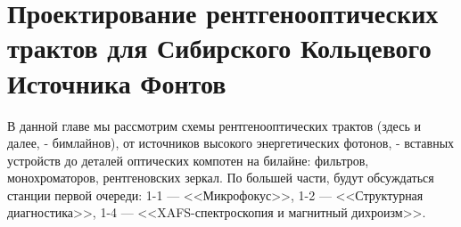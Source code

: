 \documentclass[14pt,a4paper]{extarticle}
\numberwithin{equation}{section}
\begin{document}
\section{Проектирование рентгенооптических трактов для Сибирского Кольцевого Источника Фонтов}
В данной главе мы рассмотрим схемы рентгенооптических трактов (здесь и далее, - бимлайнов), от источников высокого энергетических фотонов, - вставных устройств до деталей оптических компотен на билайне: фильтров, монохроматоров, рентгеновских зеркал. По большей части, будут обсуждаться станции первой очереди: 1-1 --- <<Микрофокус>>, 1-2 --- <<Структурная диагностика>>, 1-4 --- <<XAFS-спектроскопия и магнитный дихроизм>>.  
\end{document}
